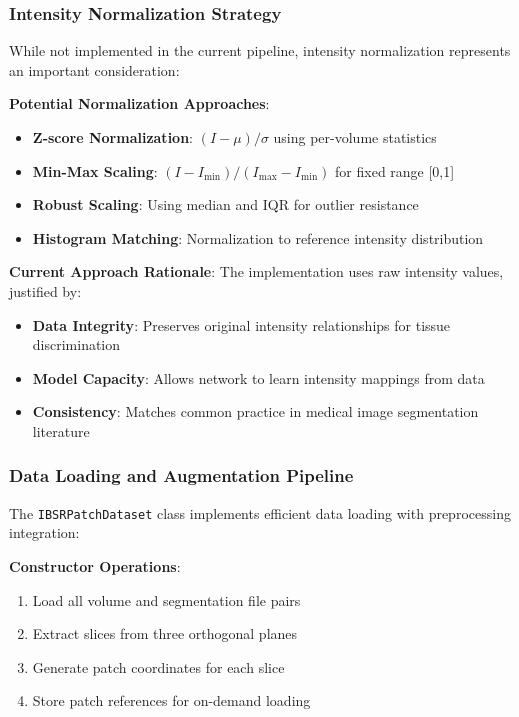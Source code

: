 \documentclass[12pt,a4paper]{article}
\begin{document}
\subsubsection{Intensity Normalization Strategy}

While not implemented in the current pipeline, intensity normalization represents an important consideration:

\textbf{Potential Normalization Approaches}:
\begin{itemize}
    \item \textbf{Z-score Normalization}: $(I - \mu) / \sigma$ using per-volume statistics
    \item \textbf{Min-Max Scaling}: $(I - I_{\min}) / (I_{\max} - I_{\min})$ for fixed range [0,1]
    \item \textbf{Robust Scaling}: Using median and IQR for outlier resistance
    \item \textbf{Histogram Matching}: Normalization to reference intensity distribution
\end{itemize}

\textbf{Current Approach Rationale}:
The implementation uses raw intensity values, justified by:
\begin{itemize}
    \item \textbf{Data Integrity}: Preserves original intensity relationships for tissue discrimination
    \item \textbf{Model Capacity}: Allows network to learn intensity mappings from data
    \item \textbf{Consistency}: Matches common practice in medical image segmentation literature
\end{itemize}

\subsubsection{Data Loading and Augmentation Pipeline}

The \texttt{IBSRPatchDataset} class implements efficient data loading with preprocessing integration:

\textbf{Constructor Operations}:
\begin{enumerate}
    \item Load all volume and segmentation file pairs
    \item Extract slices from three orthogonal planes
    \item Generate patch coordinates for each slice
    \item Store patch references for on-demand loading
\end{enumerate}
\end{document}
